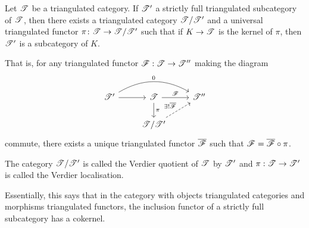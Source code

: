 \documentclass[dissertation.tex]{subfiles}
\begin{document}
\begin{thm}
  Let $\mathscr{T}$ be a triangulated category.
  If $\mathscr{T}^\prime$ a strictly full triangulated subcategory of $\mathscr{T}$, then there exists a triangulated category $\mathscr{T}/\mathscr{T}^\prime$ and a universal triangulated functor $\pi \colon \mathscr{T} \rightarrow \mathscr{T}/\mathscr{T}^\prime$ such that if $K \rightarrow \mathscr{T}$ is the kernel of $\pi$, then $\mathscr{T}^\prime$ is a subcategory of $K$.

  That is, for any triangulated functor $\mathscr{F} : \mathscr{T} \rightarrow \mathscr{T}^{\prime\prime}$ making the diagram
  $$\begin{tikzcd}
    \T^\prime \arrow{r}\arrow[bend left]{rr}{0} & \T \arrow{d}{\pi}\arrow{r}{\F} & \T^{\prime\prime}\\
    & \T/\T^\prime \arrow[dashed]{ur}{\exists !\overline{\F}}
  \end{tikzcd}$$
  commute, there exists a unique triangulated functor $\overline{\mathscr{F}}$ such that $\mathscr{F} = \overline{\mathscr{F}} \circ \pi$.
  
  The category $\mathscr{T}/\mathscr{T}^\prime$ is called the Verdier quotient of $\mathscr{T}$ by $\mathscr{T}^\prime$ and $\pi : \mathscr{T} \rightarrow \mathscr{T}^\prime$ is called the Verdier localisation.
\end{thm}

\begin{rmk}
  Essentially, this says that in the category with objects triangulated categories and morphisms triangulated functors, the inclusion functor of a strictly full subcategory has a cokernel.
\end{rmk}
\end{document}

